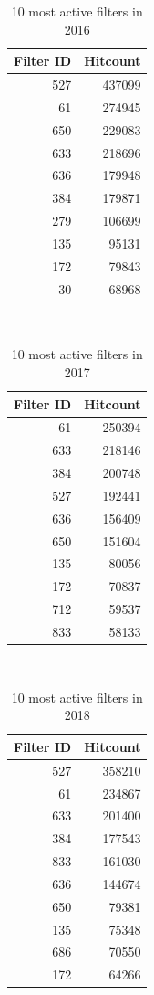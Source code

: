 \documentclass{sigchi}
\begin{document}
\begin{table}
  \centering
  \begin{tabular}{r r }
    Filter ID & Hitcount \\
    \hline
    527 & 437099 \\
    61 & 274945 \\
    650 & 229083 \\
    633 & 218696 \\
    636 & 179948 \\
    384 & 179871 \\
    279 & 106699 \\
    135 & 95131 \\
    172 & 79843 \\
    30 & 68968 \\
  \end{tabular}
  \caption{10 most active filters in 2016}~\label{tab:most-active-2016}
\end{table}

\begin{table}
  \centering
  \begin{tabular}{r r }
    Filter ID & Hitcount \\
    \hline
    61 & 250394 \\
    633 & 218146 \\
    384 & 200748 \\
    527 & 192441 \\
    636 & 156409 \\
    650 & 151604 \\
    135 & 80056 \\
    172 & 70837 \\
    712 & 59537 \\
    833 & 58133 \\
  \end{tabular}
  \caption{10 most active filters in 2017}~\label{tab:most-active-2017}
\end{table}

\begin{table}
  \centering
  \begin{tabular}{r r }
    Filter ID & Hitcount \\
    \hline
    527 & 358210 \\
    61 & 234867 \\
    633 & 201400 \\
    384 & 177543 \\
    833 & 161030 \\
    636 & 144674 \\
    650 & 79381 \\
    135 & 75348 \\
    686 & 70550 \\
    172 & 64266 \\
  \end{tabular}
  \caption{10 most active filters in 2018}~\label{tab:most-active-2018}
\end{table}
\end{document}
